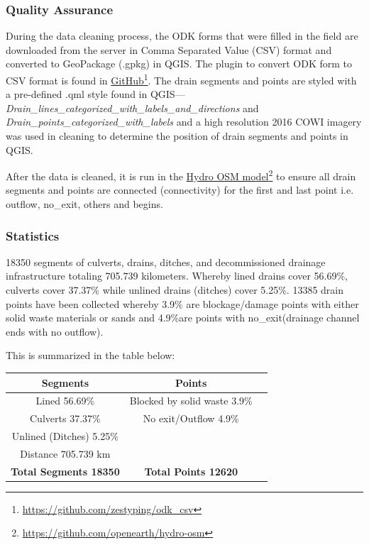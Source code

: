 \documentclass[a4paper,12pt,twoside]{article}
\begin{document}
\newpage
\subsubsection{Quality Assurance}
During the data cleaning process, the ODK forms that were filled in the field are downloaded from the server in Comma Separated Value (CSV) format and converted to GeoPackage (.gpkg) in QGIS. The plugin to convert ODK form to CSV format is found in \href{https://github.com/zestyping/odk_csv}{GitHub}\footnote{\url{https://github.com/zestyping/odk\_csv}}. The drain segments and points are styled with a pre-defined .qml style found in QGIS---\textit{Drain\_lines\_categorized\_with\_labels\_and\_directions} and \textit{Drain\_points\_categorized\_with\_labels} and a high resolution 2016 COWI imagery was used in cleaning to determine the position of drain segments and points in QGIS.

After the data is cleaned, it is run in the \href{https://github.com/openearth/hydro-osm}{Hydro OSM model}\footnote{\url{https://github.com/openearth/hydro-osm}} to ensure all drain segments and points are connected  (connectivity) for the first and last point i.e. outflow, no\_exit, others and begins.

\subsubsection{Statistics}
18350 segments of culverts, drains, ditches, and decommissioned drainage infrastructure totaling 705.739 kilometers. Whereby lined drains cover 56.69\%, culverts cover 37.37\% while unlined drains (ditches) cover 5.25\%.
13385 drain points have been collected whereby 3.9\% are blockage/damage points with either solid waste materials or sands and 4.9\%are  points with no\_exit(drainage channel ends with no outflow).

This is summarized in the table below:

\begin{center}
	\begin{tabular}{|c|c|c|}
		\hline
		\bfseries Segments & \bfseries Points\\
		\hline
		Lined 56.69\% & Blocked by solid waste 3.9\%\\
		\hline
		Culverts 37.37\% & No exit/Outflow 4.9\%\\
		\hline
		Unlined (Ditches) 5.25\% & {}\\
		\hline
		Distance 705.739 km & {}\\
		\hline
		\bfseries Total Segments 18350 & \bfseries Total Points 12620\\
		\hline
	\end{tabular}
\end{center}
\end{document}
